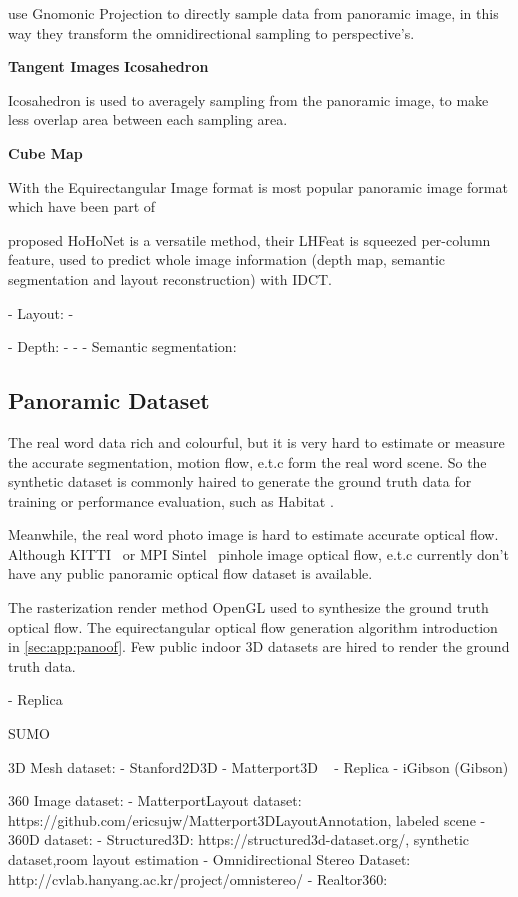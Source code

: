 \cite{CoorsCG2018} use Gnomonic Projection to directly sample data from panoramic image, in this way they transform the omnidirectional sampling to perspective's.

\textbf{Tangent Images}
\textbf{Icosahedron}

Icosahedron is used to averagely sampling from the panoramic image, to make less overlap area between each sampling area.

\cite{EderPVBF2019}




\textbf{Cube Map}

With the
Equirectangular Image format is most popular panoramic image format which have been part of 


\citet{SunSC2021} proposed HoHoNet is a versatile method, their LHFeat is squeezed per-column feature, used to predict whole image information (depth map, semantic segmentation and layout reconstruction) with IDCT. 

- Layout:
- \cite{xxxx}

- Depth:
- \cite{WangYSCT2020}
- 
- Semantic segmentation:


\subsection{Panoramic Dataset}


The real word data rich and colourful, but it is very hard to estimate or measure the accurate segmentation, motion flow, e.t.c form the real word scene.
So the synthetic dataset is commonly haired to generate the ground truth data for training or performance evaluation, such as Habitat \cite{SavvaKMZWJSLKMPB2019}.

Meanwhile, the real word photo image is hard to estimate accurate optical flow.
Although KITTI~\cite{Menze2018JPRS} or MPI Sintel~\cite{ButleWSB2012} pinhole image optical flow, e.t.c currently don't have any public panoramic optical flow dataset is available.

The rasterization render method OpenGL used to synthesize the ground truth optical flow.
The equirectangular optical flow generation algorithm introduction in \cref{sec:app:panoof}.
Few public indoor 3D datasets are hired to render the ground truth data.

- Replica ~\cite{StrauWMCWGEMRVCYBYPYZLCBGMPSBSNGLN2019}

SUMO


3D Mesh dataset:
- Stanford2D3D \cite{ArmenSZS2017}
- Matterport3D ~\cite{ChangDFHNSSZZ2017}
- Replica \cite{StrauWMCWGEMRVCYBYPYZLCBGMPSBSNGLN2019}
- iGibson (Gibson)


360 Image dataset:
- MatterportLayout dataset: https://github.com/ericsujw/Matterport3DLayoutAnnotation, labeled scene
- 360D dataset:
- Structured3D: https://structured3d-dataset.org/, synthetic dataset,room layout estimation
- Omnidirectional Stereo Dataset: http://cvlab.hanyang.ac.kr/project/omnistereo/
- Realtor360: 

